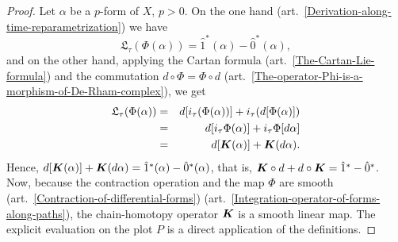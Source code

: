 \documentclass[11pt,reqno]{amsart}
\theoremstyle{definition}
\def \P{{P}}
\def \X{{X}}
\newcommand{\fL}{{\mathfrak  L}}
\newcommand{\eK}{\mbox{\boldmath $K$}}
\newcommand{\art}[1]{{(art.~\ref{#1})}}
\newcommand{\source}{\hat 0}
\newcommand{\but}{\hat 1}
\newcommand{\DLie}{{\fL}}
\begin{document}
  \begin{proof}
    Let $\alpha$ be a $p$-form of $\X$, $p>0$. On the one hand
    \art{Derivation-along-time-reparametrization} we have
    $$\DLie_\tau (\Phi(\alpha)) = \but^*(\alpha) -
      \source^*(\alpha),$$ and on the other hand, applying the
    Cartan formula \art{The-Cartan-Lie-formula} and the
    commutation $d \circ \Phi = \Phi \circ d$
    \art{The-operator-Phi-is-a-morphism-of-De-Rham-complex},
    we get
    \begin{eqnarray*}
      \DLie_\tau (\Phi(\alpha))& =&
      d[i_\tau(\Phi (\alpha))]+i_\tau (d[\Phi (\alpha)]) \\ &=&
      d[i_\tau\Phi (\alpha)]+i_\tau \Phi [d\alpha] \\
      &=& d[\eK(\alpha)] + \eK(d\alpha).
    \end{eqnarray*}
    Hence, $d[\eK(\alpha)] + \eK(d\alpha) = \but^*(\alpha) -
      \source^*(\alpha)$, that is, $\eK \circ d +d  \circ \eK =
        \but^* - \source^*$. Now, because the contraction operation
    and the map
    $\Phi$ 
    are smooth \art{Contraction-of-differential-forms}
    \art{Integration-operator-of-forms-along-paths}, the
    chain-homotopy operator $\eK$ is a smooth linear
    map. The explicit evaluation on the plot $\P$ is a direct
    application of the definitions.
  \end{proof}
  
\end{document}
